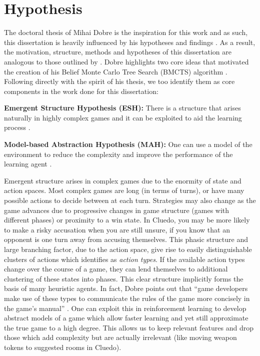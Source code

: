 \documentclass[msc, ai, logo, twoside, notimes, parskip, leftchapter, normalheadings]{infthesis}
\begin{document}
\section{Hypothesis}
The doctoral thesis of Mihai Dobre is the inspiration for this work and as such, this dissertation is heavily influenced by his hypotheses and findings \citep{Mihai}. As a result, the motivation, structure, methods and hypotheses of this dissertation are analogous to those outlined by \citep{Mihai}. Dobre highlights two core ideas that motivated the creation of his Belief Monte Carlo Tree Search (BMCTS) algorithm \citep{Mihai}. Following directly with the spirit of his thesis, we too identify them as core components in the work done for this dissertation:
\begin{description}
\item \textbf{Emergent Structure Hypothesis (ESH):} There is a structure that arises naturally in highly complex games and it can be exploited to aid the learning process \citep{Mihai}.
\item \textbf{Model-based Abstraction Hypothesis (MAH):} One can use a model of the environment to reduce the complexity and improve the performance of the learning agent \citep{Mihai}.
\end{description}
Emergent structure arises in complex games due to the enormity of state and action spaces. Most complex games are long (in terms of turns), or have many possible actions to decide between at each turn. Strategies may also change as the game advances due to progressive changes in game structure (games with different phases) or proximity to a win state. In Cluedo, you may be more likely to make a risky accusation when you are still unsure, if you know that an opponent is one turn away from accusing themselves. This phasic structure and large branching factor, due to the action space, give rise to easily distinguishable clusters of actions which \citep{Mihai} identifies as \textit{action types}. If the available action types change over the course of a game, they can lend themselves to additional clustering of these states into phases. This clear structure implicitly forms the basis of many heuristic agents. In fact, Dobre points out that ``game developers make use of these types to communicate the rules of the game more concisely in the game's manual'' \citep{Mihai}. One can exploit this in reinforcement learning to develop abstract models of a game which allow faster learning and yet still approximate the true game to a high degree. This allows us to keep relevant features and drop those which add complexity but are actually irrelevant (like moving weapon tokens to suggested rooms in Cluedo).
\end{document}
